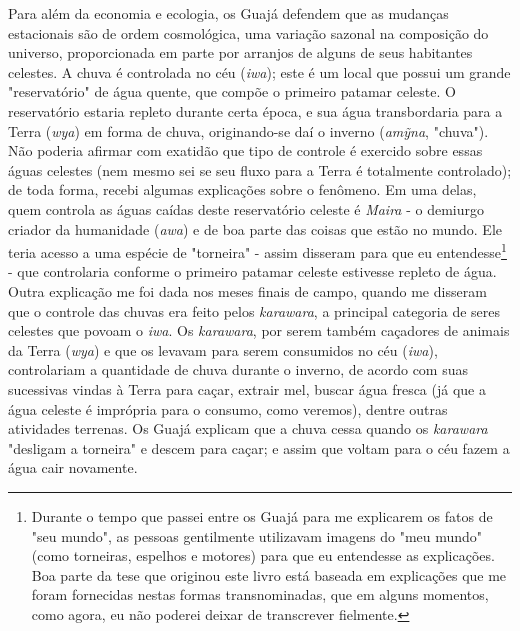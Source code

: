 Para além da economia e ecologia, os Guajá defendem que as mudanças
estacionais são de ordem cosmológica, uma variação sazonal na composição
do universo, proporcionada em parte por arranjos de alguns de seus
habitantes celestes. A chuva é controlada no céu (\emph{iwa}); este é um
local que possui um grande "reservatório" de água quente, que compõe o
primeiro patamar celeste. O reservatório estaria repleto durante certa
época, e sua água transbordaria para a Terra (\emph{wya}) em forma de
chuva, originando-se daí o inverno (\emph{amỹna}, "chuva"). Não poderia
afirmar com exatidão que tipo de controle é exercido sobre essas águas
celestes (nem mesmo sei se seu fluxo para a Terra é totalmente
controlado); de toda forma, recebi algumas explicações sobre o fenômeno.
Em uma delas, quem controla as águas caídas deste reservatório celeste é
\emph{Maira} - o demiurgo criador da humanidade (\emph{awa}) e de boa
parte das coisas que estão no mundo. Ele teria acesso a uma espécie de
"torneira" - assim disseram para que eu entendesse\footnote{Durante o
  tempo que passei entre os Guajá para me explicarem os fatos de "seu
  mundo", as pessoas gentilmente utilizavam imagens do "meu mundo" (como
  {torneiras}, {espelhos} e {motores}) para que eu entendesse as
  explicações. Boa parte da tese que originou este livro está baseada em
  explicações que me foram fornecidas nestas formas transnominadas, que
  em alguns momentos, como agora, eu não poderei deixar de transcrever
  fielmente.} - que controlaria conforme o primeiro patamar celeste
estivesse repleto de água. Outra explicação me foi dada nos meses finais
de campo, quando me disseram que o controle das chuvas era feito pelos
\emph{karawara}, a principal categoria de seres celestes que povoam o
\emph{iwa}. Os \emph{karawara}, por serem também caçadores de animais da
Terra (\emph{wya}) e que os levavam para serem consumidos no céu
(\emph{iwa}), controlariam a quantidade de chuva durante o inverno, de
acordo com suas sucessivas vindas à Terra para caçar, extrair mel,
buscar água fresca (já que a água celeste é imprópria para o consumo,
como veremos), dentre outras atividades terrenas. Os Guajá explicam que
a chuva cessa quando os \emph{karawara} "desligam a torneira" e descem
para caçar; e assim que voltam para o céu fazem a água cair novamente.

